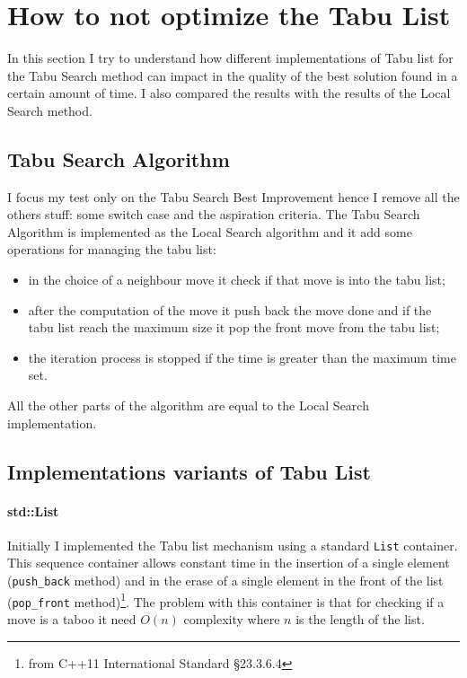 
\section{How to not optimize the Tabu List}
	In this section I try to understand how different implementations of Tabu list for the Tabu Search method can impact in the quality of the best solution found in a certain amount of time. I also compared the results with the results of the Local Search method.

\subsection{Tabu Search Algorithm}
	I focus my test only on the Tabu Search Best Improvement hence I remove all the others stuff: some switch case and the aspiration criteria.
	The Tabu Search Algorithm is implemented as the Local Search algorithm and it add some operations for managing the tabu list:
	\begin{itemize}
		\item in the choice of a neighbour move it check if that move is into the tabu list;
		\item after the computation of the move it push back the move done and if the tabu list reach the maximum size it pop the front move from the tabu list;
		\item the iteration process is stopped if the time is greater than the maximum time set.
	\end{itemize}
	All the other parts of the algorithm are equal to the Local Search implementation.
	
	
	

	\subsection{Implementations variants of Tabu List}
		
		\paragraph{std::List} Initially I implemented the Tabu list mechanism using a standard \verb|List| container. This sequence container allows constant time in the insertion of a single element (\verb|push_back| method) and in the erase of a single element in the front of the list (\verb|pop_front| method)\footnote{from C++11 International Standard §23.3.6.4}.
		The problem with this container is that for checking if a move is a taboo it need $O(n)$ complexity where $n$ is the length of the list.
		
